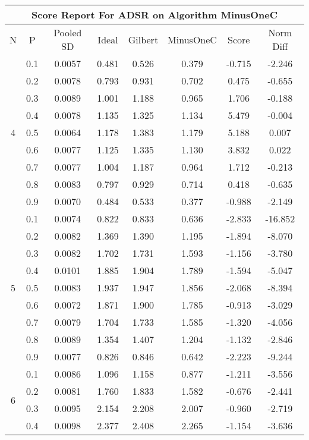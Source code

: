 \documentclass[11pt,a4paper]{report}
\begin{document}
\begin{longtable}{ | c | c || c | c | c | c | c | c | }
\hline
\multicolumn{8}{|c|}{ Score Report For ADSR on Algorithm MinusOneC} \\
\hline
N & P & Pooled SD &  Ideal &  Gilbert & MinusOneC  & Score & Norm Diff \\
 \hline
 \hline
 \endhead
\multirow{9}{*}{4} & 0.1 & 0.0057 & 0.481 & 0.526 & 0.379 & -0.715 & -2.246 \\
 & 0.2 & 0.0078 & 0.793 & 0.931 & 0.702 & 0.475 & -0.655 \\
 & 0.3 & 0.0089 & 1.001 & 1.188 & 0.965 & 1.706 & -0.188 \\
 & 0.4 & 0.0078 & 1.135 & 1.325 & 1.134 & 5.479 & -0.004 \\
 & 0.5 & 0.0064 & 1.178 & 1.383 & 1.179 & 5.188 & 0.007 \\
 & 0.6 & 0.0077 & 1.125 & 1.335 & 1.130 & 3.832 & 0.022 \\
 & 0.7 & 0.0077 & 1.004 & 1.187 & 0.964 & 1.712 & -0.213 \\
 & 0.8 & 0.0083 & 0.797 & 0.929 & 0.714 & 0.418 & -0.635 \\
 & 0.9 & 0.0070 & 0.484 & 0.533 & 0.377 & -0.988 & -2.149 \\
 \hline
\multirow{9}{*}{5} & 0.1 & 0.0074 & 0.822 & 0.833 & 0.636 & -2.833 & -16.852 \\
 & 0.2 & 0.0082 & 1.369 & 1.390 & 1.195 & -1.894 & -8.070 \\
 & 0.3 & 0.0082 & 1.702 & 1.731 & 1.593 & -1.156 & -3.780 \\
 & 0.4 & 0.0101 & 1.885 & 1.904 & 1.789 & -1.594 & -5.047 \\
 & 0.5 & 0.0083 & 1.937 & 1.947 & 1.856 & -2.068 & -8.394 \\
 & 0.6 & 0.0072 & 1.871 & 1.900 & 1.785 & -0.913 & -3.029 \\
 & 0.7 & 0.0079 & 1.704 & 1.733 & 1.585 & -1.320 & -4.056 \\
 & 0.8 & 0.0089 & 1.354 & 1.407 & 1.204 & -1.132 & -2.846 \\
 & 0.9 & 0.0077 & 0.826 & 0.846 & 0.642 & -2.223 & -9.244 \\
 \hline
\multirow{9}{*}{6} & 0.1 & 0.0086 & 1.096 & 1.158 & 0.877 & -1.211 & -3.556 \\
 & 0.2 & 0.0081 & 1.760 & 1.833 & 1.582 & -0.676 & -2.441 \\
 & 0.3 & 0.0095 & 2.154 & 2.208 & 2.007 & -0.960 & -2.719 \\
 & 0.4 & 0.0098 & 2.377 & 2.408 & 2.265 & -1.154 & -3.636 \\

\end{longtable}
\end{document}
